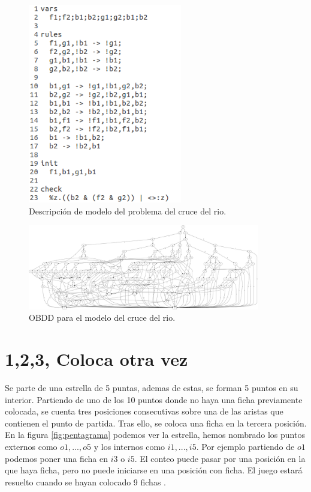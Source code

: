 \begin{figure}[H]
  \centering
  \includegraphics[width=0.6\textwidth]{Figures/rivercross.png}
  \caption{Descripción de modelo del problema del cruce del rio.}
  \label{fig:river}
\end{figure}

\begin{figure}[H]
  \centering
  \includegraphics[width=0.9\textwidth]{Figures/riverobdd.png}
  \caption{OBDD para el modelo del cruce del rio.}
  \label{fig:riverobdd}
\end{figure}

\section{1,2,3, Coloca otra vez}

Se parte de una estrella de 5 puntas, ademas de estas, se forman 5 puntos en su interior. Partiendo de uno de los 10 puntos donde no haya una ficha previamente colocada, se cuenta tres posiciones consecutivas sobre una de las aristas que contienen el punto de partida. Tras ello, se coloca una ficha en la tercera posición. En la figura \ref{fig:pentagrama} podemos ver la estrella, hemos nombrado los puntos externos como $o1, ..., o5$ y los internos como $i1, ..., i5$. Por ejemplo partiendo de $o1$ podemos poner una ficha en $i3$ o $i5$. El conteo puede pasar por una posición en la que haya ficha, pero no puede iniciarse en una posición con ficha. El juego estará resuelto cuando se hayan colocado 9 fichas \cite{Juegos:11}. 

